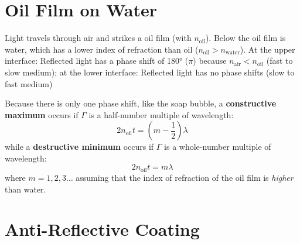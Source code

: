\section{Oil Film on Water}
\begin{figure}[ht]
  \centering
\end{figure}
Light travels through air and strikes a oil film (with $n_\text{oil}$). Below
the oil film is water, which has a lower index of refraction than oil
($n_\text{oil}>n_\text{water}$). At the upper interface: Reflected light has a
phase shift of \ang{180} ($\pi$) because $n_\text{air}<n_\text{oil}$ (fast to
slow medium); at the lower interface: Reflected light has no phase shifts (slow
to fast medium)

Because there is only one phase shift, like the soap bubble, a
\textbf{constructive maximum} occurs if $\Gamma$ is a half-number multiple of
wavelength:
\begin{equation}
  \boxed{
    2n_\text{oil}t=\left(m-\frac12\right)\lambda
  }
\end{equation}
while a \textbf{destructive minimum} occurs if $\Gamma$ is a whole-number
multiple of wavelength:
\begin{equation}
  \boxed{
    2n_\text{oil}t=m\lambda
  }
\end{equation}
where $m=1,2,3\ldots$ assuming that the index of refraction of the oil film
is \emph{higher} than water.


\section{Anti-Reflective Coating}
\begin{figure}[ht]
  \centering
\end{figure}

